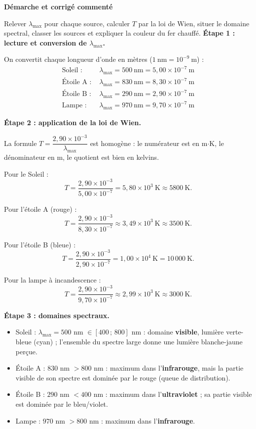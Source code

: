 \documentclass[11pt]{article}
\begin{document}
\textbf{Démarche et corrigé commenté}

\begin{exoresolu}
Relever $\lambda_{\max}$ pour chaque source, calculer $T$ par la loi de Wien, situer le domaine spectral, classer les sources et expliquer la couleur du fer chauffé.
\tcblower
\textbf{Étape 1 : lecture et conversion de $\lambda_{\max}$.}

On convertit chaque longueur d'onde en mètres ($1\ \text{nm} = 10^{-9}\ \text{m}$) :
\begin{align*}
\text{Soleil : } & \lambda_{\max} = 500\ \text{nm} = 5{,}00 \times 10^{-7}\ \text{m} \\
\text{Étoile A : } & \lambda_{\max} = 830\ \text{nm} = 8{,}30 \times 10^{-7}\ \text{m} \\
\text{Étoile B : } & \lambda_{\max} = 290\ \text{nm} = 2{,}90 \times 10^{-7}\ \text{m} \\
\text{Lampe : } & \lambda_{\max} = 970\ \text{nm} = 9{,}70 \times 10^{-7}\ \text{m}
\end{align*}

\textbf{Étape 2 : application de la loi de Wien.}

La formule $T = \dfrac{2{,}90 \times 10^{-3}}{\lambda_{\max}}$ est homogène : le numérateur est en m$\cdot$K, le dénominateur en m, le quotient est bien en kelvins.

Pour le Soleil :
\[ T = \frac{2{,}90 \times 10^{-3}}{5{,}00 \times 10^{-7}} = 5{,}80 \times 10^{3}\ \text{K} \approx 5800\ \text{K}. \]

Pour l'étoile A (rouge) :
\[ T = \frac{2{,}90 \times 10^{-3}}{8{,}30 \times 10^{-7}} \approx 3{,}49 \times 10^{3}\ \text{K} \approx 3500\ \text{K}. \]

Pour l'étoile B (bleue) :
\[ T = \frac{2{,}90 \times 10^{-3}}{2{,}90 \times 10^{-7}} = 1{,}00 \times 10^{4}\ \text{K} = 10\,000\ \text{K}. \]

Pour la lampe à incandescence :
\[ T = \frac{2{,}90 \times 10^{-3}}{9{,}70 \times 10^{-7}} \approx 2{,}99 \times 10^{3}\ \text{K} \approx 3000\ \text{K}. \]

\textbf{Étape 3 : domaines spectraux.}
\begin{itemize}
\item Soleil : $\lambda_{\max} = 500$ nm $\in [400\,;\,800]$ nm : domaine \textbf{visible}, lumière verte-bleue (cyan) ; l'ensemble du spectre large donne une lumière blanche-jaune perçue.
\item Étoile A : $830$ nm $> 800$ nm : maximum dans l'\textbf{infrarouge}, mais la partie visible de son spectre est dominée par le rouge (queue de distribution).
\item Étoile B : $290$ nm $< 400$ nm : maximum dans l'\textbf{ultraviolet} ; sa partie visible est dominée par le bleu/violet.
\item Lampe : $970$ nm $> 800$ nm : maximum dans l'\textbf{infrarouge}.
\end{itemize}


\end{exoresolu}
\end{document}
